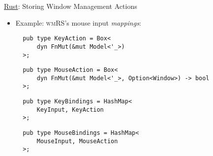 \begin{frame}[fragile]{\underline{Rust}: Storing Window Management Actions \hfill {\footnotesize \currentname}}


    \begin{itemize}

        \item Example: \textsc{wmRS}'s mouse input \textit{mappings}:\\[3pt]
\begin{verbatim}
  pub type KeyAction = Box<
      dyn FnMut(&mut Model<'_>)
  >;
\end{verbatim}
\begin{verbatim}
  pub type MouseAction = Box<
      dyn FnMut(&mut Model<'_>, Option<Window>) -> bool
  >;
\end{verbatim}
\begin{verbatim}
  pub type KeyBindings = HashMap<
      KeyInput, KeyAction
  >;
\end{verbatim}
\begin{verbatim}
  pub type MouseBindings = HashMap<
      MouseInput, MouseAction
  >;
\end{verbatim}

    \end{itemize}

    \vfill

\end{frame}

